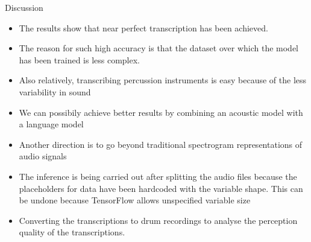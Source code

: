 \begin{frame}[t,fragile]{Discussion}
\begin{itemize}
\item The results show that near perfect transcription has been achieved.
\item The reason for such high accuracy is that the dataset over which the model has been trained is less complex.
\item Also relatively, transcribing percussion instruments is easy because of the less variability in sound
\item We can possibily achieve better results by combining an acoustic model with a language model
\item Another direction is to go beyond traditional spectrogram representations of audio signals
\item The inference is being carried out after splitting the audio files because the placeholders for data have been hardcoded with the variable shape. This can be undone because TensorFlow allows unspecified variable size
\item Converting the transcriptions to drum recordings to analyse the perception quality of the transcriptions.
\end{itemize}
\end{frame}

